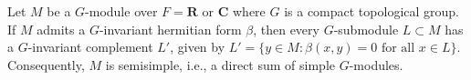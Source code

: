 Let $M$ be a $G$-module over $F = \mathbf{R}$ or $\mathbf{C}$ where $G$ is a compact topological group. If $M$ admits a $G$-invariant hermitian form $\beta$, then every $G$-submodule $L \subset M$ has a $G$-invariant complement $L'$, given by $L' = \{y \in M : \beta(x, y) = 0 \text{ for all } x \in L\}$. Consequently, $M$ is semisimple, i.e., a direct sum of simple $G$-modules.
